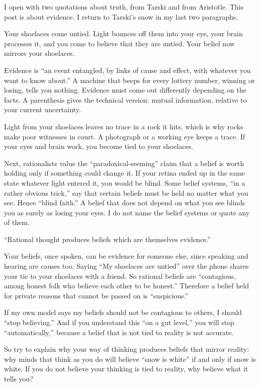 
I open with two quotations about truth, from Tarski and from Aristotle. This post is about evidence. I return to Tarski's snow in my last two paragraphs.

Your shoelaces come untied. Light bounces off them into your eye, your brain processes it, and you come to believe that they are untied. Your belief now mirrors your shoelaces.

Evidence is ``an event entangled, by links of cause and effect, with whatever you want to know about.'' A machine that beeps for every lottery number, winning or losing, tells you nothing. Evidence must come out differently depending on the facts. A parenthesis gives the technical version: mutual information, relative to your current uncertainty. 

Light from your shoelaces leaves no trace in a rock it hits, which is why rocks make poor witnesses in court. A photograph or a working eye keeps a trace. If your eyes and brain work, you become tied to your shoelaces.

Next, rationalists value the ``paradoxical-seeming'' claim that a belief is worth holding only if something could change it. If your retina ended up in the same state whatever light entered it, you would be blind. Some belief systems, ``in a rather obvious trick,'' say that certain beliefs must be held no matter what you see. Hence ``blind faith.'' A belief that does not depend on what you see blinds you as surely as losing your eyes. I do not name the belief systems or quote any of them.

``Rational thought produces beliefs which are themselves evidence.''

Your beliefs, once spoken, can be evidence for someone else, since speaking and hearing are causes too. Saying ``My shoelaces are untied'' over the phone shares your tie to your shoelaces with a friend. So rational beliefs are ``contagious, among honest folk who believe each other to be honest.'' Therefore a belief held for private reasons that cannot be passed on is ``suspicious.''

If my own model says my beliefs should not be contagious to others, I should ``stop believing.'' And if you understand this ``on a gut level,'' you will stop ``automatically,'' because a belief that is not tied to reality is not accurate. 

So try to explain why your way of thinking produces beliefs that mirror reality: why minds that think as you do will believe ``snow is white'' if and only if snow is white. If you do not believe your thinking is tied to reality, why believe what it tells you? 
